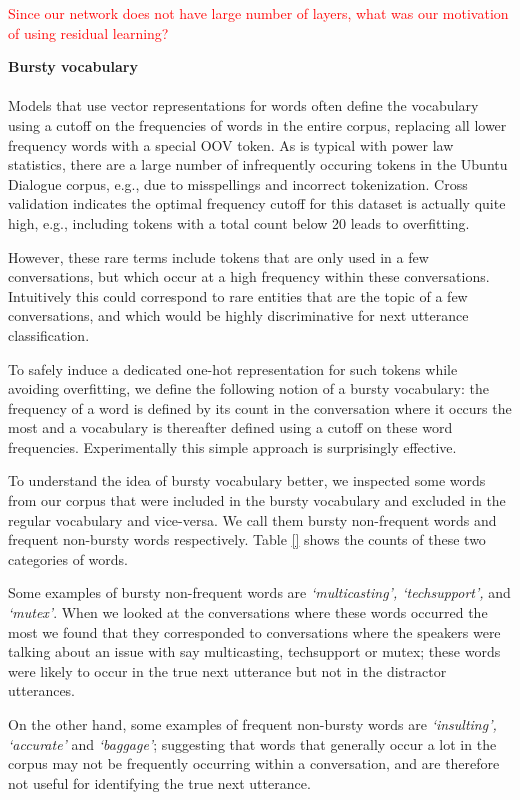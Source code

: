 \documentclass[11pt]{article}
\begin{document}
\textcolor{red}{Since our network does not have large number of layers, what was our motivation of using residual learning?}

\textbf{Bursty vocabulary}\\\\

Models that use vector representations for words often define the
vocabulary using a cutoff on the frequencies of words in the entire
corpus, replacing all lower frequency words with a special OOV token.
As is typical with power law statistics, there are a large number of
infrequently occuring tokens in the Ubuntu Dialogue corpus, e.g., due
to misspellings and incorrect tokenization.  Cross validation indicates
the optimal frequency cutoff for this dataset is actually quite high,
e.g., including tokens with a total count below 20 leads to overfitting.

However, these rare terms include tokens that are only used in a
few conversations, but which occur at a high frequency within 
these conversations.  Intuitively this could correspond to rare entities
that are the topic of a few conversations, and which would be 
highly discriminative for next utterance classification.

To safely induce a dedicated one-hot representation for such tokens
while avoiding overfitting, we define the following notion of a bursty
vocabulary: the frequency of a word is defined by its count in the
conversation where it occurs the most and a vocabulary is thereafter
defined using a cutoff on these word frequencies.  Experimentally
this simple approach is surprisingly effective.

To understand the idea of bursty vocabulary better, we inspected some
words from our corpus that were included in the bursty vocabulary and
excluded in the regular vocabulary and vice-versa. We call them bursty
non-frequent words and frequent non-bursty words respectively. Table
\ref{} shows the counts of these two categories of words. 

Some examples of bursty non-frequent words are \textit{`multicasting',
`techsupport',} and  \textit{`mutex'}.  When we looked at the
conversations where these words occurred the most we found that they
corresponded to conversations where the speakers were talking about an
issue with say multicasting, techsupport or mutex; these words were likely
to occur in the true next utterance but not in the distractor utterances.

On the other hand, some examples of frequent non-bursty words are
\textit{`insulting', `accurate'} and \textit{`baggage'}; suggesting that
words that generally occur a lot in the corpus may not be frequently
occurring within a conversation, and are therefore not useful for
identifying the true next utterance.
\end{document}
